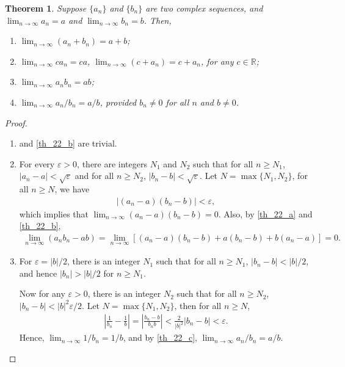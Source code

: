 \documentclass[11pt]{book}
\newtheorem{theorem}{Theorem}[chapter]
\theoremstyle{definition}
\numberwithin{equation}{chapter}
\begin{document}
\begin{theorem}\label{th_22}
Suppose $\{a_n\}$ and $\{b_n\}$ are two complex sequences, and $\lim_{n\to\infty} a_n = a$ and $\lim_{n\to\infty} b_n = b$. Then,
\begin{enumerate}[label=(\alph*)]
    \item $\lim_{n\to\infty} (a_n + b_n) = a + b$; \label{th_22_a}
    
    \item $\lim_{n\to\infty} c a_n = ca$, $\lim_{n\to\infty} (c + a_n) = c + a_n$, for any $c \in \mathbb{R}$; \label{th_22_b}
    
    \item $\lim_{n\to\infty} a_n b_n = ab$; \label{th_22_c}
    
    \item $\lim_{n\to\infty} a_n/b_n = a/b$, provided $b_n \neq 0$ for all $n$ and $b \neq 0$. \label{th_22_d}
\end{enumerate}
\end{theorem}
\begin{proof}
~\begin{enumerate}[label=(\alph*)]
    \item and \ref{th_22_b} are trivial.
    
    \setcounter{enumi}{2}
    \item For every $\varepsilon > 0$, there are integers $N_1$ and $N_2$ such that for all $n \geq N_1$, $\left|a_n - a\right| < \sqrt{\varepsilon}$ and for all $n \geq N_2$, $\left|b_n - b\right| < \sqrt{\varepsilon}$. Let $N = \max \{N_1, N_2\}$, for all $n \geq N$, we have
    \begin{align*}
        \left|(a_n - a)(b_n - b)\right| < \varepsilon,
    \end{align*}
    which implies that $\lim_{n\to\infty} (a_n - a)(b_n - b) = 0$. Also, by \ref{th_22_a} and \ref{th_22_b},
    \begin{align*}
        \lim_{n\to\infty} (a_nb_n - ab) = \lim_{n\to\infty} \left[(a_n - a)(b_n - b) + a(b_n - b) + b(a_n - a)\right] = 0.
    \end{align*}
    
    \item For $\varepsilon = \left|b\right|/2$, there is an integer $N_1$ such that for all $n \geq N_1$, $ \left|b_n - b\right| < \left|b\right|/2$, and hence $\left|b_n\right| > \left|b\right|/2$ for $n \geq N_1$. 
    
    Now for any $\varepsilon > 0$, there is an integer $N_2$ such that for all $n \geq N_2$, $\left|b_n - b\right| < \left|b\right|^2\varepsilon/2$. Let $N = \max \{N_1, N_2\}$, then for all $n \geq N$, 
    \begin{align*}
        \left|\frac{1}{b_n} - \frac{1}{b}\right| = \left|\frac{b_n - b}{b_n b}\right| < \frac{2}{\left|b\right|^2} \left|b_n - b\right| < \varepsilon.
    \end{align*}
    Hence, $\lim_{n\to\infty} 1/b_n = 1/b$, and by \ref{th_22_c}, $\lim_{n\to\infty} a_n/b_n = a/b$.
\end{enumerate}
\end{proof}
\end{document}
